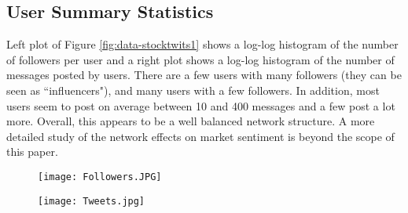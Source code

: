 



\subsection{User Summary Statistics}\label{app_userstats}

Left plot of Figure \ref{fig:data-stocktwits1} shows a log-log histogram of the number of followers per user and a right plot shows a log-log histogram of the number of messages posted by users. There are a few users with many followers (they can be seen as ``influencers"), and many users with a few followers. In addition, most users seem to post on average between 10 and 400 messages and a few post a lot more. Overall, this appears to be a well balanced network structure. A more detailed study of the network effects on market sentiment is beyond the scope of this paper.



\begin{figure*}[h]
\centering
        \begin{subfigure}{0.49\textwidth}   
            \centering 
            \texttt{[image: Followers.JPG]}
        \end{subfigure}
        \begin{subfigure}{0.49\textwidth}
            \centering
            \texttt{[image: Tweets.jpg]}
        \end{subfigure}

        \label{fig:data-stocktwits1}
\end{figure*}



